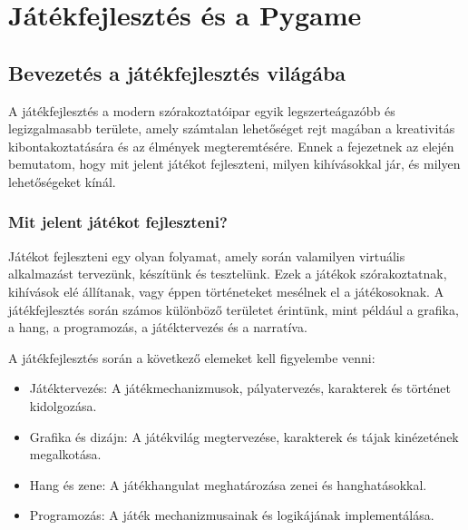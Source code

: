 \chapter{Játékfejlesztés és a Pygame}

\section{Bevezetés a játékfejlesztés világába}

 A játékfejlesztés a modern szórakoztatóipar egyik legszerteágazóbb és legizgalmasabb területe, amely számtalan lehetőséget rejt magában a kreativitás kibontakoztatására és az élmények megteremtésére. Ennek a fejezetnek az elején bemutatom, hogy mit jelent játékot fejleszteni, milyen kihívásokkal jár, és milyen lehetőségeket kínál.

\subsection{Mit jelent játékot fejleszteni?}
 Játékot fejleszteni egy olyan folyamat, amely során valamilyen virtuális alkalmazást tervezünk, készítünk és tesztelünk. Ezek a játékok szórakoztatnak, kihívások elé állítanak, vagy éppen történeteket mesélnek el a játékosoknak. A játékfejlesztés során számos különböző területet érintünk, mint például a grafika, a hang, a programozás, a játéktervezés és a narratíva.

A játékfejlesztés során a következő elemeket kell figyelembe venni:

\begin{itemize}
    \item Játéktervezés: A játékmechanizmusok, pályatervezés, karakterek és történet kidolgozása.
    \item Grafika és dizájn: A játékvilág megtervezése, karakterek és tájak kinézetének megalkotása.
    \item Hang és zene: A játékhangulat meghatározása zenei és hanghatásokkal.
    \item Programozás: A játék mechanizmusainak és logikájának implementálása.
\end{itemize}
